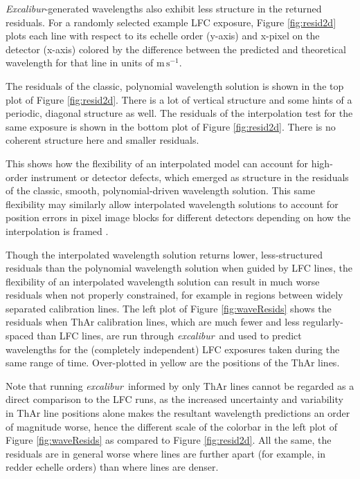 \documentclass[twocolumn,table,xcolor,trackchanges]{aastex63}
\newcommand{\project}[1]{\textsl{#1}}
\newcommand{\name}{\project{excalibur}}
\newcommand{\Name}{\project{Excalibur}}
\newcommand{\mps}{\mathrm{m\,s^{-1}}}
\begin{document}
\Name -generated wavelengths also exhibit less structure in the returned residuals.  For a randomly selected example LFC exposure, Figure \ref{fig:resid2d} plots each line with respect to its echelle order (y-axis) and x-pixel on the detector (x-axis) colored by the difference between the predicted and theoretical wavelength for that line in units of $\mps$.

The residuals of the classic, polynomial wavelength solution is shown in the top plot of Figure \ref{fig:resid2d}.  There is a lot of vertical structure and some hints of a periodic, diagonal structure as well.  The residuals of the interpolation test for the same exposure is shown in the bottom plot of Figure \ref{fig:resid2d}.  There is no coherent structure here and smaller residuals. 

This shows how the flexibility of an interpolated model can account for high-order instrument or detector defects, which emerged as structure in the residuals of the classic, smooth, polynomial-driven wavelength solution.  This same flexibility may similarly allow interpolated wavelength solutions to account for position errors in pixel image blocks for different detectors depending on how the interpolation is framed \citep{fischer2016, milakovic2020}.

Though the interpolated wavelength solution returns lower, less-structured residuals than the polynomial wavelength solution when guided by LFC lines, the flexibility of an interpolated wavelength solution can result in much worse residuals when not properly constrained, for example in regions between widely separated calibration lines.  The left plot of Figure \ref{fig:waveResids} shows the residuals when ThAr calibration lines, which are much fewer and less regularly-spaced than LFC lines, are run through \name\ and used to predict wavelengths for the (completely independent) LFC exposures taken during the same range of time.  Over-plotted in yellow are the positions of the ThAr lines. 

Note that running \name\ informed by only ThAr lines cannot be regarded as a direct comparison to the LFC runs, as the increased uncertainty and variability in ThAr line positions alone makes the resultant wavelength predictions an order of magnitude worse, hence the different scale of the colorbar in the left plot of Figure \ref{fig:waveResids} as compared to Figure \ref{fig:resid2d}.  All the same, the residuals are in general worse where lines are further apart (for example, in redder echelle orders) than where lines are denser.
\end{document}
